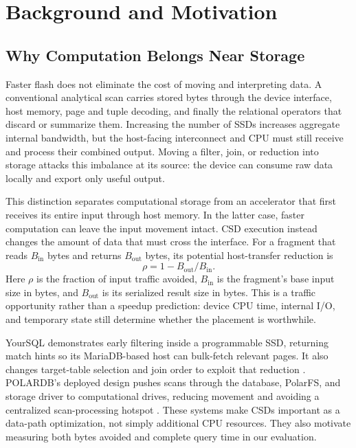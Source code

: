 \documentclass[sigconf, nonacm]{acmart}
\begin{document}
\section{Background and Motivation}
\label{sec:motivation}
\subsection{Why Computation Belongs Near Storage}
Faster flash does not eliminate the cost of moving and interpreting data.
A conventional analytical scan carries stored bytes through the device
interface, host memory, page and tuple decoding, and finally the relational
operators that discard or summarize them. Increasing the number of SSDs
increases aggregate internal bandwidth, but the host-facing interconnect and
CPU must still receive and process their combined output. Moving a filter,
join, or reduction into storage attacks this imbalance at its source: the
device can consume raw data locally and export only useful output.

This distinction separates computational storage from an accelerator that
first receives its entire input through host memory. In the latter case,
faster computation can leave the input movement intact. CSD execution instead
changes the amount of data that must cross the interface. For a fragment
that reads $B_{\mathrm{in}}$ bytes and returns $B_{\mathrm{out}}$ bytes, its
potential host-transfer reduction is
\begin{equation}
 \rho=1-B_{\mathrm{out}}/B_{\mathrm{in}}.
\end{equation}
Here $\rho$ is the fraction of input traffic avoided, $B_{\mathrm{in}}$ is
the fragment's base input size in bytes, and $B_{\mathrm{out}}$ is its
serialized result size in bytes. This is a traffic opportunity rather than
a speedup prediction: device CPU time, internal I/O, and temporary state
still determine whether the placement is worthwhile.

YourSQL demonstrates early filtering inside a programmable SSD, returning
match hints so its MariaDB-based host can bulk-fetch relevant pages. It also
changes target-table selection and join order to exploit that reduction
\cite{yoursql}. POLARDB's deployed design pushes scans through the database,
PolarFS, and storage driver to computational drives, reducing movement and
avoiding a centralized scan-processing hotspot \cite{polardb}. These systems
make CSDs important as a data-path optimization, not simply additional CPU
resources. They also motivate measuring both bytes avoided and complete
query time in our evaluation.
\end{document}
